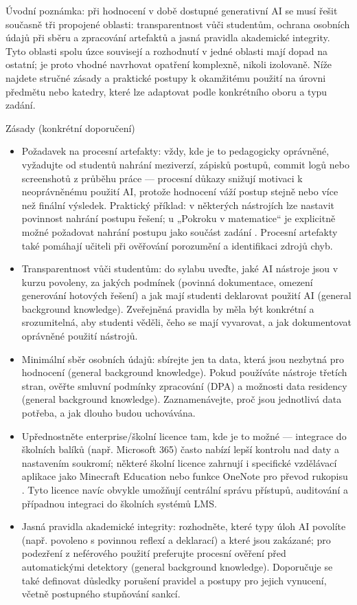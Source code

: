 Úvodní poznámka: při hodnocení v době dostupné generativní AI se musí řešit současně tři propojené oblasti: transparentnost vůči studentům, ochrana osobních údajů při sběru a zpracování artefaktů a jasná pravidla akademické integrity. Tyto oblasti spolu úzce souvisejí a rozhodnutí v jedné oblasti mají dopad na ostatní; je proto vhodné navrhovat opatření komplexně, nikoli izolovaně. Níže najdete stručné zásady a praktické postupy k okamžitému použití na úrovni předmětu nebo katedry, které lze adaptovat podle konkrétního oboru a typu zadání.

Zásady (konkrétní doporučení)
\begin{itemize}
  \item Požadavek na procesní artefakty: vždy, kde je to pedagogicky oprávněné, vyžadujte od studentů nahrání meziverzí, zápisků postupů, commit logů nebo screenshotů z průběhu práce — procesní důkazy snižují motivaci k neoprávněnému použití AI, protože hodnocení váží postup stejně nebo více než finální výsledek. Praktický příklad: v některých nástrojích lze nastavit povinnost nahrání postupu řešení; u „Pokroku v matematice“ je explicitně možné požadovat nahrání postupu jako součást zadání \cite{kb_ai_101_tipu_pdf_04e4a115_page_8_1}. Procesní artefakty také pomáhají učiteli při ověřování porozumění a identifikaci zdrojů chyb.
  \item Transparentnost vůči studentům: do sylabu uveďte, jaké AI nástroje jsou v kurzu povoleny, za jakých podmínek (povinná dokumentace, omezení generování hotových řešení) a jak mají studenti deklarovat použití AI (general background knowledge). Zveřejněná pravidla by měla být konkrétní a srozumitelná, aby studenti věděli, čeho se mají vyvarovat, a jak dokumentovat oprávněné použití nástrojů.
  \item Minimální sběr osobních údajů: sbírejte jen ta data, která jsou nezbytná pro hodnocení (general background knowledge). Pokud používáte nástroje třetích stran, ověřte smluvní podmínky zpracování (DPA) a možnosti data residency (general background knowledge). Zaznamenávejte, proč jsou jednotlivá data potřeba, a jak dlouho budou uchovávána.
  \item Upřednostněte enterprise/školní licence tam, kde je to možné — integrace do školních balíků (např. Microsoft 365) často nabízí lepší kontrolu nad daty a nastavením soukromí; některé školní licence zahrnují i specifické vzdělávací aplikace jako Minecraft Education nebo funkce OneNote pro převod rukopisu \cite{kb_ai_101_tipu_pdf_04e4a115_page_15_2,kb_ai_101_tipu_pdf_04e4a115_page_14_1}. Tyto licence navíc obvykle umožňují centrální správu přístupů, auditování a případnou integraci do školních systémů LMS.
  \item Jasná pravidla akademické integrity: rozhodněte, které typy úloh AI povolíte (např. povoleno s povinnou reflexí a deklarací) a které jsou zakázané; pro podezření z neférového použití preferujte procesní ověření před automatickými detektory (general background knowledge). Doporučuje se také definovat důsledky porušení pravidel a postupy pro jejich vynucení, včetně postupného stupňování sankcí.
\end{itemize}

